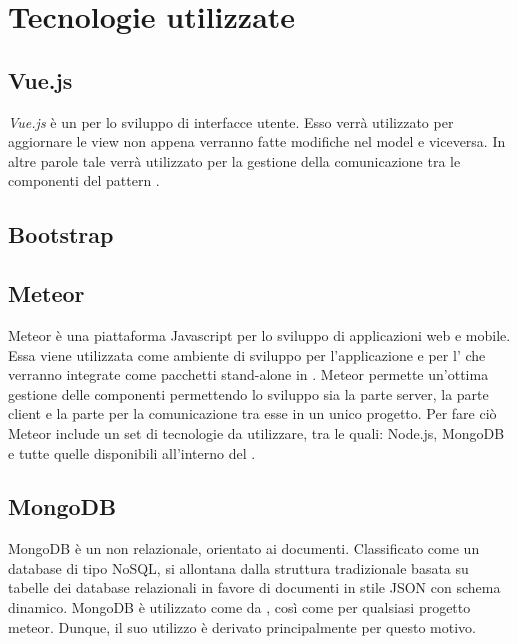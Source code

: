 \section{Tecnologie utilizzate}

\subsection{Vue.js}
\textit{Vue.js} è un  per lo sviluppo di interfacce utente. Esso verrà utilizzato per aggiornare le view non appena verranno fatte modifiche nel model e viceversa. In altre parole tale  verrà utilizzato per la gestione della comunicazione tra le componenti del pattern .

\subsection{Bootstrap}

\subsection{Meteor}
Meteor è una piattaforma Javascript per lo sviluppo di applicazioni web e mobile. Essa viene utilizzata come ambiente di sviluppo per l'applicazione e per l' che verranno integrate come pacchetti stand-alone in .
Meteor permette un'ottima gestione delle componenti permettendo lo sviluppo sia la parte server, la parte client e la parte per la comunicazione tra esse in un unico progetto. Per fare ciò Meteor include un set di tecnologie da utilizzare, tra le quali: Node.js, MongoDB e tutte quelle disponibili all'interno del  .
\subsection{MongoDB}
MongoDB è un  non relazionale, orientato ai documenti. Classificato come un database di tipo NoSQL, si allontana dalla
struttura tradizionale basata su tabelle dei database relazionali in favore di documenti in stile
JSON con schema dinamico. MongoDB è utilizzato come  da , così come per qualsiasi progetto meteor. Dunque, il suo utilizzo è derivato principalmente per questo motivo.
